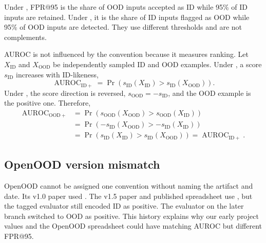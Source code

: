 Under \idpos, FPR@95 is the share of OOD inputs accepted as ID while 95\% of
ID inputs are retained. Under \oodpos, it is the share of ID inputs flagged as
OOD while 95\% of OOD inputs are detected. They use different thresholds and
are not complements.

AUROC is not influenced by the convention because it measures ranking. Let
$X_{\mathrm{ID}}$ and $X_{\mathrm{OOD}}$ be independently sampled ID and OOD
examples. Under \idpos, a score $s_{\mathrm{ID}}$ increases with ID-likeness,
\[
  \operatorname{AUROC}_{\mathrm{ID+}}
  = \Pr\!\left(s_{\mathrm{ID}}(X_{\mathrm{ID}})
    > s_{\mathrm{ID}}(X_{\mathrm{OOD}})\right).
\]
Under \oodpos, the score direction is reversed,
$s_{\mathrm{OOD}}=-s_{\mathrm{ID}}$, and the OOD example is the positive one.
Therefore,
\begin{align*}
  \operatorname{AUROC}_{\mathrm{OOD+}}
  &= \Pr\!\left(s_{\mathrm{OOD}}(X_{\mathrm{OOD}})
    > s_{\mathrm{OOD}}(X_{\mathrm{ID}})\right) \\
  &= \Pr\!\left(-s_{\mathrm{ID}}(X_{\mathrm{OOD}})
    > -s_{\mathrm{ID}}(X_{\mathrm{ID}})\right) \\
  &= \Pr\!\left(s_{\mathrm{ID}}(X_{\mathrm{ID}})
    > s_{\mathrm{ID}}(X_{\mathrm{OOD}})\right)
   = \operatorname{AUROC}_{\mathrm{ID+}}.
\end{align*}


\subsection{OpenOOD version mismatch}

\headingindent
OpenOOD cannot be assigned one convention without naming the artifact and
date. Its v1.0 paper used \idpos. The v1.5 paper and published spreadsheet use
\oodpos, but the tagged  evaluator still encoded ID as positive.
The evaluator on the later  branch switched to OOD as positive.
This history explains why our early project values and the OpenOOD spreadsheet
could have matching AUROC but different FPR@95.

